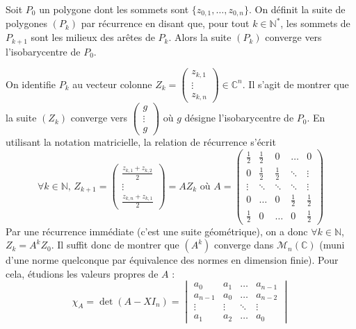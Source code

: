 
	\begin{theorem}
		Soit $P_0$ un polygone dont les sommets sont $\{ z_{0,1}, \dots, z_{0,n} \}$. On définit la suite de polygones $(P_k)$ par récurrence en disant que, pour tout $k \in \mathbb{N}^*$, les sommets de $P_{k+1}$ sont les milieux des arêtes de $P_k$.
		Alors la suite $(P_k)$ converge vers l'isobarycentre de $P_0$.
	\end{theorem}

	\begin{demonstration}
		On identifie $P_k$ au vecteur colonne $Z_k = \begin{pmatrix} z_{k,1} \\ \vdots \\ z_{k,n} \end{pmatrix} \in \mathbb{C}^n$. Il s'agit de montrer que la suite $(Z_k)$ converge vers $\begin{pmatrix} g \\ \vdots \\ g \end{pmatrix}$ où $g$ désigne l'isobarycentre de $P_0$.
		\newpar
		En utilisant la notation matricielle, la relation de récurrence s'écrit
		\[ \forall k \in \mathbb{N}, \, Z_{k+1} = \begin{pmatrix} \frac{z_{k,1} + z_{k,2}}{2} \\ \vdots \\ \frac{z_{k,n} + z_{k,1}}{2} \end{pmatrix} = AZ_k \text{ où } A = \begin{pmatrix} \frac{1}{2} & \frac{1}{2} & 0 & \dots & 0 \\ 0 & \frac{1}{2} & \frac{1}{2} & \ddots & \vdots \\ \vdots & \ddots & \ddots & \ddots & \vdots \\ 0 & \dots & 0 & \frac{1}{2} & \frac{1}{2} \\ \frac{1}{2} & 0 & \dots & 0 & \frac{1}{2} \end{pmatrix} \]
		Par une récurrence immédiate (c'est une suite géométrique), on a donc $\forall k \in \mathbb{N}$, $Z_k = A^k Z_0$. Il suffit donc de montrer que $(A^k)$ converge dans $\mathcal{M}_n(\mathbb{C})$ (muni d'une norme quelconque par équivalence des normes en dimension finie).
		\newpar
		Pour cela, étudions les valeurs propres de $A$ :
		\[ \chi_A = \det(A - X I_n) = \begin{vmatrix} a_0 & a_1 & \dots & a_{n-1} \\ a_{n-1} & a_0 & \dots & a_{n-2}\\ \vdots & \vdots & \ddots & \vdots \\ a_1 & a_2 & \dots & a_0 \end{vmatrix} \]

\end{demonstration}
